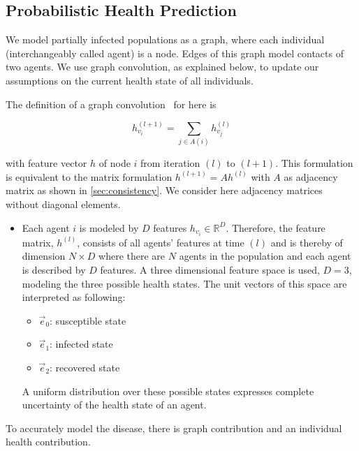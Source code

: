 
\subsection{Probabilistic Health Prediction}

We model partially infected populations as a graph, where each individual (interchangeably called agent) is a node. Edges of this graph model contacts of two agents. We use graph convolution, as explained below, to update our assumptions on the current health state of all individuals.

The definition of a graph convolution~\cite{Kipf2017SemiSupervisedCW} for here is

\begin{equation}
	\label{eq:graph_convolution}
	h_{v_i}^{(l+1)} = \sum_{j\in A(i)} h_{v_j}^{(l)}
\end{equation}

with feature vector $h$ of node $i$ from iteration $(l)$ to $(l+1)$. This formulation is equivalent to the matrix formulation $h^{(l+1)} = A h^{(l)}$ with $A$ as adjacency matrix as shown in \cref{sec:consistency}. We consider here adjacency matrices without diagonal elements.

\begin{itemize}
    \item Each agent $i$ is modeled by $D$ features $h_{v_i} \in \mathbb{R}^D$. Therefore, the feature matrix, $h^{(l)}$, consists of all agents' features at time $(l)$ and is thereby of dimension $N\times D$ where there are $N$ agents in the population and each agent is described by $D$ features. A three dimensional feature space is used, $D=3$, modeling the three possible health states. The unit vectors of this space are interpreted as following:
	\begin{itemize}
		\item $\vec{e}_0$: susceptible state
		\item $\vec{e}_1$: infected state
		\item $\vec{e}_2$: recovered state
	\end{itemize}
	A uniform distribution over these possible states expresses complete uncertainty of the health state of an agent.
\end{itemize}

To accurately model the disease, there is graph contribution and an individual health contribution.

